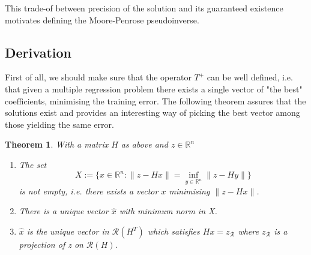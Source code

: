 \documentclass[a4paper]{article}
\theoremstyle{break}
\newtheorem{theorem}{Theorem}[section]
\newcommand{\R}{\mathbb{R}}
\newcommand{\Ra}{\mathcal{R}}
\begin{document}
This trade-of between precision of the solution and its guaranteed existence motivates defining the Moore-Penrose pseudoinverse.

\subsection{Derivation}
First of all, we should make sure that the operator $T^+$ can be well defined, i.e. that given a multiple regression problem there exists a single vector of "the best" coefficients, minimising the training error. The following theorem assures that the solutions exist and provides an interesting way of picking the best vector among those yielding the same error.

\begin{theorem}\label{thm:regression_solution}
With a matrix $H$ as above and $z \in \R^n$
\begin{enumerate}
    \item The set
        \begin{equation*}
        X := \{ x \in \R^n : \| z - H x \| = \inf\limits_{y \in \R^n} \| z - H y \| \}
        \end{equation*}
        is not empty, i.e. there exists a vector $x$ minimising $\| z - H x \|$.
    \item There is a unique vector $\hat{x}$ with minimum norm in X.
    \item $\hat{x}$ is the unique vector in $\Ra(H^T)$ which satisfies $ H x = z_\Ra $ where $ z_\Ra $ is a projection of z on $ \Ra(H) $.
\end{enumerate}

\end{theorem}
\end{document}
